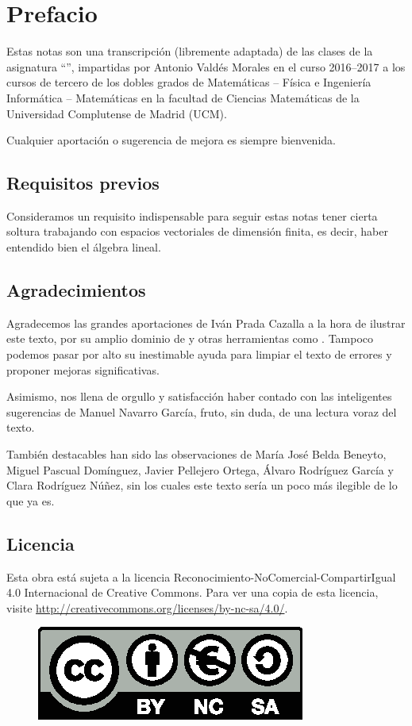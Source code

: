 \section*{Prefacio}
Estas notas son una transcripción (libremente adaptada) de las clases de la asignatura ``'', impartidas por Antonio Valdés Morales en el curso 2016--2017 a los cursos de tercero de los dobles grados de  Matemáticas -- Física e Ingeniería Informática -- Matemáticas en la facultad de Ciencias Matemáticas de la Universidad Complutense de Madrid (UCM).

Cualquier aportación o sugerencia de mejora es siempre bienvenida.
\subsection*{Requisitos previos}
Consideramos un requisito indispensable para seguir estas notas tener cierta soltura trabajando con espacios vectoriales de dimensión finita, es decir, haber entendido bien el álgebra lineal.

\subsection*{Agradecimientos}
Agradecemos las grandes aportaciones de Iván Prada Cazalla a la hora de ilustrar este texto, por su amplio dominio de  y otras herramientas como . Tampoco podemos pasar por alto su inestimable ayuda para limpiar el texto de errores y proponer mejoras significativas.

Asimismo, nos llena de orgullo y satisfacción haber contado con las inteligentes sugerencias de Manuel Navarro García, fruto, sin duda, de una lectura voraz del texto.

También destacables han sido las observaciones de María José Belda Beneyto, Miguel Pascual Domínguez, Javier Pellejero Ortega, Álvaro Rodríguez García y Clara Rodríguez Núñez, sin los cuales este texto sería un poco más ilegible de lo que ya es.
\subsection*{Licencia}
Esta obra está sujeta a la licencia Reconocimiento-NoComercial-CompartirIgual 4.0 Internacional de Creative Commons. Para ver una copia de esta licencia, visite \url{http://creativecommons.org/licenses/by-nc-sa/4.0/}.
\begin{figure}[h]
	\centering
	\includegraphics[scale=1]{Graficos/licencia.eps}
	\end{figure}